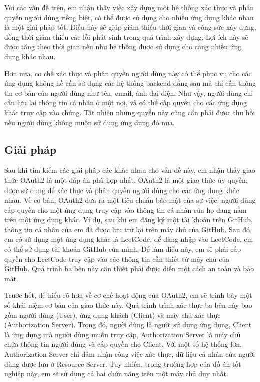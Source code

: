 \documentclass[../DoAn.tex]{subfiles}
\begin{document}
Với các vấn đề trên, em nhận thấy việc xây dựng một hệ thống xác thực và phân quyền người dùng riêng biệt, có thể được sử dụng cho nhiều ứng dụng khác nhau là một giải pháp tốt.
Điều này sẽ giúp giảm thiểu thời gian và công sức xây dựng, đồng thời giảm thiểu các lỗi phát sinh trong quá trình xây dựng. Lợi ích này sẽ được tăng theo thời gian nếu như
hệ thống được sử dụng cho càng nhiều ứng dụng khác nhau.

Hơn nữa, cơ chế xác thực và phân quyền người dùng này có thể phục vụ cho các ứng dụng không hề cần sử dụng các hệ thống backend đằng sau mà chỉ cần thông tin
cơ bản của người dùng như tên, email, ảnh đại diện. Như vậy, người dùng chỉ cần lưu lại thông tin cá nhân ở một nơi, và có thể cấp quyền cho các ứng dụng khác
truy cập vào chúng. Tất nhiên những quyền này cũng cần phải được thu hồi nếu người dùng không muốn sử dụng ứng dụng đó nữa.

\subsection{Giải pháp}
\label{subsection:5.2.2}

Sau khi tìm kiếm các giải pháp các khác nhau cho vấn đề này, em nhận thấy giao thức OAuth2 là một đáp án phù hợp nhất. OAuth2 là một giao thức ủy quyền, được sử dụng
để xác thực và phân quyền người dùng cho các ứng dụng khác nhau. Về cơ bản, OAuth2 đưa ra một tiêu chuẩn bảo mật của sự việc: người dùng cấp quyền cho một ứng dụng
truy cập vào thông tin cá nhân của họ đang nằm trên một ứng dụng khác. Ví dụ, sau khi em đăng ký một tài khoản trên GitHub, thông tin cá nhân của em đã được lưu trữ lại
trên máy chủ của GitHub. Sau đó, em có sử dụng một ứng dụng khác là LeetCode, để đăng nhập vào LeetCode, em có thể sử dụng tài khoản GitHub của mình. Để làm điều này,
em sẽ phải cấp quyền cho LeetCode truy cập vào các thông tin cần thiết từ máy chủ của GitHub. Quá trình ba bên này cần thiết phải được diễn một cách an toàn và bảo mật.

Trước hết, để hiểu rõ hơn về cơ chế hoạt động của OAuth2, em sẽ trình bày một số khái niệm cơ bản của giao thức này. Quá trình trình xác thực ba bên này bao gồm
người dùng (User), ứng dụng khách (Client) và máy chủ xác thực (Authorization Server). Trong đó, người dùng là người sử dụng ứng dụng, Client là ứng dụng mà người dùng
muốn truy cập, Authorization Server là máy chủ chứa thông tin người dùng và cấp quyền cho Client. Với một số hệ thống lớn, Authorization Server chỉ đảm nhận công việc xác thực,
dữ liệu cá nhân của người dùng được lưu ở Resource Server. Tuy nhiên, trong trường hợp của đồ án tốt nghiệp này, em sẽ sử dụng cả hai chức năng trên một máy chủ duy nhất.
\end{document}
